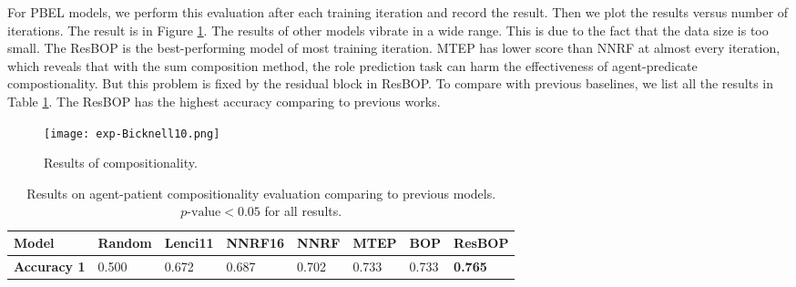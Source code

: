 \documentclass[a4paper]{article}
\begin{document}
For PBEL models, we perform this evaluation after each training iteration and record the result. Then we plot the results versus number of iterations. The result is in Figure \ref{fig:exp-Bicknell10}. The results of other models vibrate in a wide range. This is due to the fact that the data size is too small. The ResBOP is the best-performing model of most training iteration. MTEP has lower score than NNRF at almost every iteration, which reveals that with the sum composition method, the role prediction task can harm the effectiveness of agent-predicate compostionality. But this problem is fixed by the residual block in ResBOP. To compare with previous baselines, we list all the results in Table \ref{tab:Bicknell10}. The ResBOP has the highest accuracy comparing to previous works. 

\begin{figure}[t]
\centering
\texttt{[image: exp-Bicknell10.png]}
\caption{\label{fig:exp-Bicknell10} Results of compositionality.}
\end{figure}

\begin{table}
\centering
\begin{tabular}{l|lll|llll}
\textbf{Model}      & Random & Lenci11 & NNRF16 & NNRF & MTEP &   BOP    &   ResBOP         \\ \hline \hline
\textbf{Accuracy 1} & 0.500  & 0.672   & 0.687  & 0.702& 0.733&   0.733  & \textbf{0.765}   \\
\end{tabular}
\caption{\label{tab:Bicknell10} Results on agent-patient compositionality evaluation comparing to previous models. $p\text{-value} < 0.05$ for all results. }
\end{table}
\end{document}
